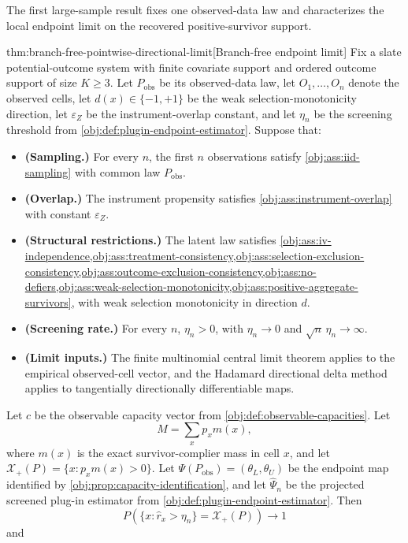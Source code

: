 The first large-sample result fixes one observed-data law and characterizes the local endpoint limit on the recovered positive-survivor support.

\begin{theoremv}{thm:branch-free-pointwise-directional-limit}[Branch-free endpoint limit]
Fix a slate potential-outcome system with finite covariate support and ordered outcome support of size \(K\ge 3\).  Let \(P_{\mathrm{obs}}\) be its observed-data law, let \(O_1,\ldots,O_n\) denote the observed cells, let \(d(x)\in\{-1,+1\}\) be the weak selection-monotonicity direction, let \(\varepsilon_Z\) be the instrument-overlap constant, and let \(\eta_n\) be the screening threshold from \cref{obj:def:plugin-endpoint-estimator}.  Suppose that:
\begin{itemize}
\item \textbf{(Sampling.)} For every \(n\), the first \(n\) observations satisfy \cref{obj:ass:iid-sampling} with common law \(P_{\mathrm{obs}}\).
\item \textbf{(Overlap.)} The instrument propensity satisfies \cref{obj:ass:instrument-overlap} with constant \(\varepsilon_Z\).
\item \textbf{(Structural restrictions.)} The latent law satisfies \cref{obj:ass:iv-independence,obj:ass:treatment-consistency,obj:ass:selection-exclusion-consistency,obj:ass:outcome-exclusion-consistency,obj:ass:no-defiers,obj:ass:weak-selection-monotonicity,obj:ass:positive-aggregate-survivors}, with weak selection monotonicity in direction \(d\).
\item \textbf{(Screening rate.)} For every \(n\), \(\eta_n>0\), with \(\eta_n\to0\) and \(\sqrt n\,\eta_n\to\infty\).
\item \textbf{(Limit inputs.)} The finite multinomial central limit theorem applies to the empirical observed-cell vector, and the Hadamard directional delta method applies to tangentially directionally differentiable maps.
\end{itemize}
Let \(c\) be the observable capacity vector from \cref{obj:def:observable-capacities}.  Let
\[
M=\sum_x p_x m(x),
\]
where \(m(x)\) is the exact survivor-complier mass in cell \(x\), and let \(\mathcal X_+(P)=\{x:p_xm(x)>0\}\).  Let \(\Psi(P_{\mathrm{obs}})=(\theta_L,\theta_U)\) be the endpoint map identified by \cref{obj:prop:capacity-identification}, and let \(\widehat\Psi_n\) be the projected screened plug-in estimator from \cref{obj:def:plugin-endpoint-estimator}.  Then
\[
P\!\left(\{x:\widehat r_x>\eta_n\}=\mathcal X_+(P)\right)\to 1
\]
and

\end{theoremv}

